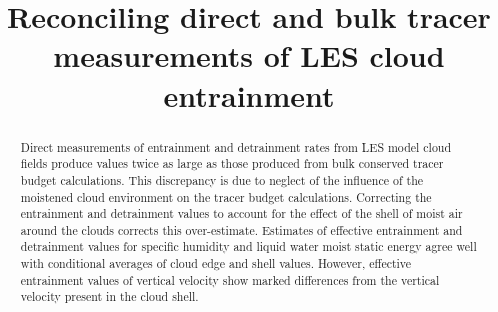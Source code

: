 \documentclass[draft,grl]{agutex}
\begin{document}
%
%


\title{Reconciling direct and bulk tracer measurements of LES cloud entrainment}
%

%
%






%
%


\begin{abstract}
Direct measurements of entrainment and detrainment rates from LES model 
cloud fields produce values twice as large as those produced from bulk 
conserved tracer budget calculations.  This discrepancy is due to neglect of 
the influence of the moistened cloud environment on the tracer budget 
calculations.  Correcting the entrainment and detrainment values to account for 
the effect of the shell of moist air around the clouds corrects this 
over-estimate.  Estimates of effective entrainment and detrainment values for
specific humidity and liquid water moist static energy agree well with
conditional averages of cloud edge and shell values.  However, effective 
entrainment values of vertical velocity show marked differences from the 
vertical velocity present in the cloud shell.
\end{abstract}

%
%
\end{document}
